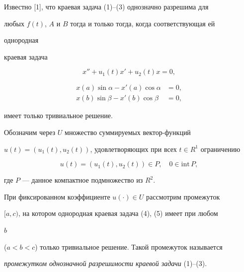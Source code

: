  


Известно [1], что краевая задача (1)--(3) однозначно разрешима для 


любых $f(t)$, $A$ и $B$ тогда и только тогда, когда соответствующая ей 


однородная 


краевая задача 


\begin{equation} 


x''+u_1(t)x'+u_2(t)x=0, 


\end{equation} 




\begin{equation} 


\begin{split} 


x(a)\sin\alpha-x'(a)\cos\alpha&=0,\\ 


x(b)\sin\beta-x'(b)\cos\beta&=0, 


\end{split} 


\end{equation} 


имеет только тривиальное решение. 


 


Обозначим через $U$ множество суммируемых вектор-функций


$u(t)=(u_1(t),u_2(t))$, удовлетворяющих при всех $t\in R^1$ ограничению 


\begin{equation} 


u(t)=(u_1(t),u_2(t))\in P,\quad 0\in\text{int}\,P, 


\end{equation} 


где $P$ --- данное компактное подмножество из $R^2$. 


 


При фиксированном коэффициенте $u(\cdot)\in U$ рассмотрим промежуток 


$[a,c)$, на котором однородная краевая задача (4), (5) имеет при любом 


$b$ 


($a<b<c$) только тривиальное решение. Такой промежуток называется 


{\it промежутком однозначной разрешимости краевой задачи} (1)--(3). 


